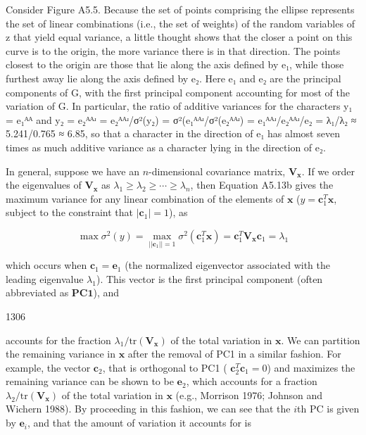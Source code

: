 \documentclass{article}
\begin{document}
Consider Figure A5.5. Because the set of points comprising the ellipse represents the set of linear combinations (i.e., the set of weights) of the random variables of z that yield equal variance, a little thought shows that the closer a point on this curve is to the origin, the more variance there is in that direction. The points closest to the origin are those that lie along the axis defined by e₁, while those furthest away lie along the axis defined by e₂. Here e₁ and e₂ are the principal components of G, with the first principal component accounting for most of the variation of G. In particular, the ratio of additive variances for the characters y₁ = e₁ᴬᴬ and y₂ = e₂ᴬᴬʴ = e₂ᴬᴬʴ/σ²(y₂) = σ²(e₁ᴬᴬʴ/σ²(e₂ᴬᴬʴ) = e₁ᴬᴬʴ/e₂ᴬᴬʴ/e₂ = λ₁/λ₂ ≈ 5.241/0.765 ≈ 6.85, so that a character in the direction of e₁ has almost seven times as much additive variance as a character lying in the direction of e₂.

In general, suppose we have an $n$-dimensional covariance matrix, $\mathbf{V}_{\mathbf{x}}$. If we order the eigenvalues of $\mathbf{V}_{\mathbf{x}}$ as $\lambda_{1} \geq \lambda_{2} \geq \cdots \geq \lambda_{n}$, then Equation A5.13b gives the maximum variance for any linear combination of the elements of $\mathbf{x}$ ($y = \mathbf{c}_{1}^{T} \mathbf{x}$, subject to the constraint that $|\mathbf{c}_{1}| = 1$), as

\begin{equation}
\max\sigma^{2}(y)=\max_{||\mathbf{c}_{1}||=1}\sigma^{2}(\mathbf{c}_{1}^{T}\mathbf{x})=\mathbf{c}_{1}^{T}\mathbf{V}_{\mathbf{x}}\mathbf{c}_{1}=\lambda_{1}
\end{equation}

which occurs when  $ \mathbf{c}_1 = \mathbf{e}_1 $ (the normalized eigenvector associated with the leading eigenvalue  $ \lambda_1 $). This vector is the first principal component (often abbreviated as  $ \mathbf{PC1} $), and

1306

accounts for the fraction  $ \lambda_1/\text{tr}(\mathbf{V}_\mathbf{x}) $ of the total variation in  $ \mathbf{x} $. We can partition the remaining variance in  $ \mathbf{x} $ after the removal of PC1 in a similar fashion. For example, the vector  $ \mathbf{c}_2 $, that is orthogonal to PC1 ( $ \mathbf{c}_2^T \mathbf{c}_1 = 0 $) and maximizes the remaining variance can be shown to be  $ \mathbf{e}_2 $, which accounts for a fraction  $ \lambda_2/\text{tr}(\mathbf{V}_\mathbf{x}) $ of the total variation in  $ \mathbf{x} $ (e.g., Morrison 1976; Johnson and Wichern 1988). By proceeding in this fashion, we can see that the  $ i $th PC is given by  $ \mathbf{e}_i $, and that the amount of variation it accounts for is
\end{document}
